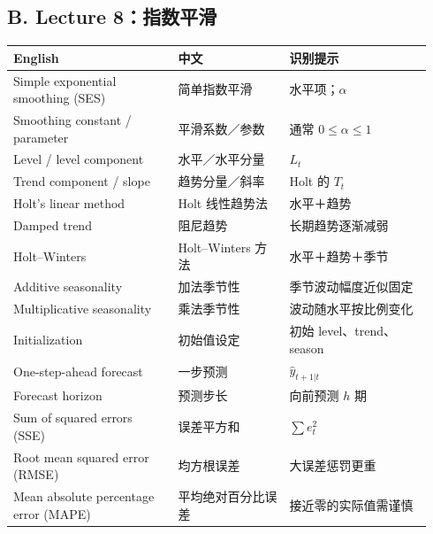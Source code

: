 \documentclass[UTF8,fontset=fandol,10.5pt,a4paper]{ctexart}
\begin{document}
\subsection*{B. Lecture 8：指数平滑}
\begin{longtable}{@{}p{0.37\linewidth}p{0.25\linewidth}p{0.32\linewidth}@{}}
\toprule English & 中文 & 识别提示\\\midrule\endhead
Simple exponential smoothing (SES) & 简单指数平滑 & 水平项；$\alpha$\\
Smoothing constant / parameter & 平滑系数／参数 & 通常 $0\le\alpha\le1$\\
Level / level component & 水平／水平分量 & $L_t$\\
Trend component / slope & 趋势分量／斜率 & Holt 的 $T_t$\\
Holt's linear method & Holt 线性趋势法 & 水平＋趋势\\
Damped trend & 阻尼趋势 & 长期趋势逐渐减弱\\
Holt--Winters & Holt--Winters 方法 & 水平＋趋势＋季节\\
Additive seasonality & 加法季节性 & 季节波动幅度近似固定\\
Multiplicative seasonality & 乘法季节性 & 波动随水平按比例变化\\
Initialization & 初始值设定 & 初始 level、trend、season\\
One-step-ahead forecast & 一步预测 & $\hat y_{t+1|t}$\\
Forecast horizon & 预测步长 & 向前预测 $h$ 期\\
Sum of squared errors (SSE) & 误差平方和 & $\sum e_t^2$\\
Root mean squared error (RMSE) & 均方根误差 & 大误差惩罚更重\\
Mean absolute percentage error (MAPE) & 平均绝对百分比误差 & 接近零的实际值需谨慎\\
\bottomrule
\end{longtable}
\end{document}
